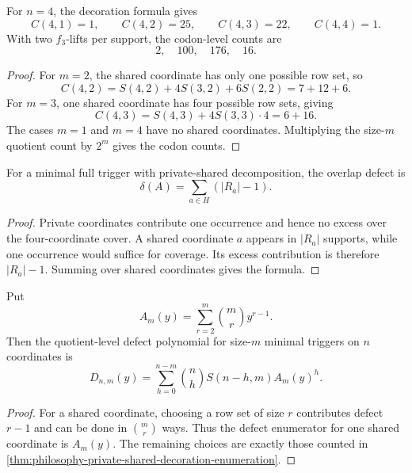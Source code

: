 \begin{corollary}
\label{cor:philosophy-codon-counts-decorated-partitions}
For $n=4$, the decoration formula gives
$$
  C(4,1)=1,
  \qquad
  C(4,2)=25,
  \qquad
  C(4,3)=22,
  \qquad
  C(4,4)=1.
$$
With two $f_{3}$-lifts per support, the codon-level counts are
$$
  2,\quad100,\quad176,\quad16.
$$
\end{corollary}
\begin{proof}
For $m=2$, the shared coordinate has only one possible row set, so
$$
  C(4,2)
  =
  S(4,2)+4S(3,2)+6S(2,2)
  =
  7+12+6.
$$
For $m=3$, one shared coordinate has four possible row sets, giving
$$
  C(4,3)
  =
  S(4,3)+4S(3,3)\cdot4
  =
  6+16.
$$
The cases $m=1$ and $m=4$ have no shared coordinates. Multiplying the
size-$m$ quotient count by $2^{m}$ gives the codon counts.
\end{proof}

\begin{theorem}
\label{thm:philosophy-defect-from-shared-coordinates}
For a minimal full trigger with private-shared decomposition, the
overlap defect is
$$
  \delta(A)
  =
  \sum_{a\in H}(|R_{a}|-1).
$$
\end{theorem}
\begin{proof}
Private coordinates contribute one occurrence and hence no excess over
the four-coordinate cover. A shared coordinate $a$ appears in $|R_{a}|$
supports, while one occurrence would suffice for coverage. Its excess
contribution is therefore $|R_{a}|-1$. Summing over shared coordinates
gives the formula.
\end{proof}

\begin{theorem}
\label{thm:philosophy-defect-refined-decoration-polynomial}
Put
$$
  A_{m}(y)
  =
  \sum_{r=2}^{m}\binom{m}{r}y^{r-1}.
$$
Then the quotient-level defect polynomial for size-$m$ minimal triggers
on $n$ coordinates is
$$
  D_{n,m}(y)
  =
  \sum_{h=0}^{n-m}
  \binom{n}{h}
  S(n-h,m)
  A_{m}(y)^{h}.
$$
\end{theorem}
\begin{proof}
For a shared coordinate, choosing a row set of size $r$ contributes
defect $r-1$ and can be done in $\binom{m}{r}$ ways. Thus the defect
enumerator for one shared coordinate is $A_{m}(y)$. The remaining
choices are exactly those counted in
\autoref{thm:philosophy-private-shared-decoration-enumeration}.
\end{proof}

